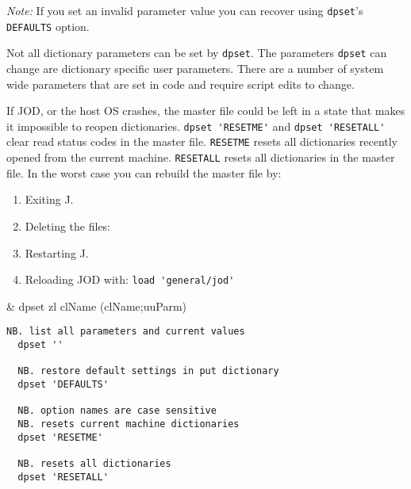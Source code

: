 \emph{Note:} If you set an invalid parameter
 value you can recover using \texttt{dpset}'s \texttt{DEFAULTS} option. 

Not all dictionary parameters can be set by \texttt{dpset}. 
The parameters \texttt{dpset} can change are dictionary specific 
user parameters. There are a number of system wide parameters 
that are set in code and require script edits to change. 

If JOD, or the host OS crashes, the master file could be
 left in a state that makes it impossible to reopen dictionaries.
  \verb|dpset 'RESETME'| and \verb|dpset 'RESETALL'| clear read status codes in the master file.
   \texttt{RESETME} resets all dictionaries recently opened from the current machine. 
   \texttt{RESETALL} resets all dictionaries in the master file.  
   In the worst case you can rebuild the master file by:
	\noindent\begin{enumerate}
           \itemsep2pt\parskip0pt
	  \item Exiting J.
	  \item Deleting the files:
	  \item Restarting J.
	  \item Reloading JOD with: \verb|load 'general/jod'|
	\end{enumerate}  

\begin{wordhead}
\monad & dpset zl \argsep clName \argsep (clName;uuParm) \\
\end{wordhead}
\begin{lstlisting}[frame=single,framerule=0pt]
  NB. list all parameters and current values
  dpset ''  
  
  NB. restore default settings in put dictionary          
  dpset 'DEFAULTS'    

  NB. option names are case sensitive 
  NB. resets current machine dictionaries
  dpset 'RESETME'  
  
  NB. resets all dictionaries    
  dpset 'RESETALL'
\end{lstlisting}  


